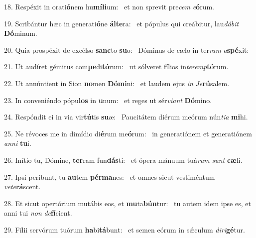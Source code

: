 18. Respéxit in orati\textbf{ó}nem hu\textbf{mí}\textbf{li}um: \ast\  et non sprevit pre\textit{cem} \textit{e}\textbf{ó}rum.\

19. Scribántur hæc in generati\textbf{ó}ne \textbf{ál}\textbf{te}ra: \ast\  et pópulus qui creábitur, lau\textit{dá}\textit{bit} \textbf{Dó}minum.\

20. Quia prospéxit de excélso \textbf{sanc}to \textbf{su}o: \ast\  Dóminus de cælo in ter\textit{ram} \textit{a}\textbf{spé}xit:\

21. Ut audíret gémitus com\textbf{pe}di\textbf{tó}rum: \ast\  ut sólveret fílios in\textit{ter}\textit{emp}\textbf{tó}rum.\

22. Ut annúntient in Sion \textbf{no}men \textbf{Dó}\textbf{mi}ni: \ast\  et laudem ejus \textit{in} \textit{Je}\textbf{rú}salem.\

23. In conveniéndo pópu\textbf{los} in \textbf{u}num: \ast\  et reges ut sér\textit{vi}\textit{ant} \textbf{Dó}mino.\

24. Respóndit ei in via vir\textbf{tú}tis \textbf{su}æ: \ast\  Paucitátem diérum meórum nún\textit{ti}\textit{a} \textbf{mi}hi.\

25. Ne révoces me in dimídio di\textbf{é}rum me\textbf{ó}rum: \ast\  in generatiónem et generatiónem \textit{an}\textit{ni} \textbf{tu}i.\

26. Inítio tu, Dómine, \textbf{ter}ram fun\textbf{dás}ti: \ast\  et ópera mánuum tuá\textit{rum} \textit{sunt} \textbf{cæ}li.\

27. Ipsi períbunt, tu \textbf{au}tem \textbf{pér}\textbf{ma}nes: \ast\  et omnes sicut vestiméntum \textit{ve}\textit{te}\textbf{rá}scent.\

28. Et sicut opertórium mutábis eos, et \textbf{mu}ta\textbf{bún}tur: \ast\  tu autem idem ipse es, et anni tui \textit{non} \textit{de}\textbf{fí}cient.\

29. Fílii servórum tuórum \textbf{ha}bi\textbf{tá}bunt: \ast\  et semen eórum in sǽculum \textit{di}\textit{ri}\textbf{gé}tur.\

